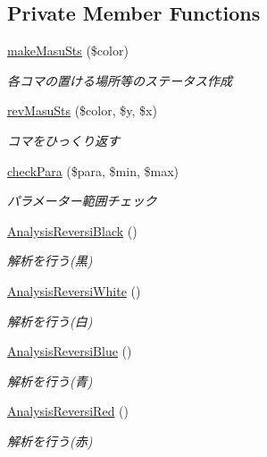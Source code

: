 \subsection*{Private Member Functions}
\begin{DoxyCompactItemize}
\item 
\hyperlink{class_reversi_a88869682786bb7c45c3488113deaa789}{make\+Masu\+Sts} (\$color)
\begin{DoxyCompactList}\small\item\em 各コマの置ける場所等のステータス作成 \end{DoxyCompactList}\item 
\hyperlink{class_reversi_af29cd3f41dc1cffead056dbbed55ae7a}{rev\+Masu\+Sts} (\$color, \$y, \$x)
\begin{DoxyCompactList}\small\item\em コマをひっくり返す \end{DoxyCompactList}\item 
\hyperlink{class_reversi_ac8d57b64bc839c8bb1f53a2a5db11228}{check\+Para} (\$para, \$min, \$max)
\begin{DoxyCompactList}\small\item\em パラメーター範囲チェック \end{DoxyCompactList}\item 
\hyperlink{class_reversi_a471972ec549188f7eb701d57e14ae7a1}{Analysis\+Reversi\+Black} ()
\begin{DoxyCompactList}\small\item\em 解析を行う(黒) \end{DoxyCompactList}\item 
\hyperlink{class_reversi_a3c30afb2509b0782b1c22a8770c68c48}{Analysis\+Reversi\+White} ()
\begin{DoxyCompactList}\small\item\em 解析を行う(白) \end{DoxyCompactList}\item 
\hyperlink{class_reversi_a3b581c4861bda72706a1d7146c910ad2}{Analysis\+Reversi\+Blue} ()
\begin{DoxyCompactList}\small\item\em 解析を行う(青) \end{DoxyCompactList}\item 
\hyperlink{class_reversi_ad44cfa7c45a98365df2d6db094d61901}{Analysis\+Reversi\+Red} ()
\begin{DoxyCompactList}\small\item\em 解析を行う(赤) \end{DoxyCompactList}\end{DoxyCompactItemize}
